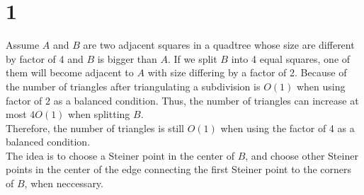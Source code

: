 
\section*{1}

Assume $A$ and $B$ are two adjacent squares in a quadtree whose size are different
by factor of 4 and $B$ is bigger than $A$. If we split $B$ into 4 equal squares,
one of them will become adjacent to $A$ with size differing by a factor of 2. Because of the
number of triangles after triangulating a subdivision is $O(1)$ when using factor of $2$
as a balanced condition. Thus, the number of triangles can increase at most $4O(1)$
when splitting $B$. \\

Therefore, the number of triangles is still $O(1)$ when using the factor of 4 as
a balanced condition. \\

The idea is to choose a Steiner point in the center of $B$, and choose other Steiner points
in the center of the edge connecting the first Steiner point to the corners of $B$, when neccessary. \\
